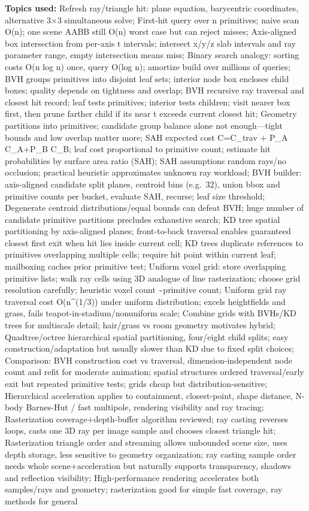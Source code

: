 \textbf{Topics used:} Refresh ray/triangle hit: plane equation, barycentric coordinates, alternative 3×3 simultaneous solve; First-hit query over n primitives; naive scan O(n); one scene AABB still O(n) worst case but can reject misses; Axis-aligned box intersection from per-axis t intervals; intersect x/y/z slab intervals and ray parameter range, empty intersection means miss; Binary search analogy: sorting costs O(n log n) once, query O(log n); amortize build over millions of queries; BVH groups primitives into disjoint leaf sets; interior node box encloses child boxes; quality depends on tightness and overlap; BVH recursive ray traversal and closest hit record; leaf tests primitives; interior tests children; visit nearer box first, then prune farther child if its near t exceeds current closest hit; Geometry partitions into primitives; candidate group balance alone not enough---tight bounds and low overlap matter more; SAH expected cost C=C\_trav + P\_A C\_A+P\_B C\_B; leaf cost proportional to primitive count; estimate hit probabilities by surface area ratio (SAH); SAH assumptions random rays/no occlusion; practical heuristic approximates unknown ray workload; BVH builder: axis-aligned candidate split planes, centroid bins (e.g.~32), union bbox and primitive counts per bucket, evaluate SAH, recurse; leaf size threshold; Degenerate centroid distributions/equal bounds can defeat BVH; huge number of candidate primitive partitions precludes exhaustive search; KD tree spatial partitioning by axis-aligned planes; front-to-back traversal enables guaranteed closest first exit when hit lies inside current cell; KD trees duplicate references to primitives overlapping multiple cells; require hit point within current leaf; mailboxing caches prior primitive test; Uniform voxel grid: store overlapping primitive lists; walk ray cells using 3D analogue of line rasterization; choose grid resolution carefully; heuristic voxel count \textasciitilde primitive count; Uniform grid ray traversal cost O(n\^{}(1/3)) under uniform distribution; excels heightfields and grass, fails teapot-in-stadium/nonuniform scale; Combine grids with BVHs/KD trees for multiscale detail; hair/grass vs room geometry motivates hybrid; Quadtree/octree hierarchical spatial partitioning, four/eight child splits; easy construction/adaptation but usually slower than KD due to fixed split choices; Comparison: BVH construction cost vs traversal, dimension-independent node count and refit for moderate animation; spatial structures ordered traversal/early exit but repeated primitive tests; grids cheap but distribution-sensitive; Hierarchical acceleration applies to containment, closest-point, shape distance, N-body Barnes-Hut / fast multipole, rendering visibility and ray tracing; Rasterization coverage+depth-buffer algorithm reviewed; ray casting reverses loops, casts one 3D ray per image sample and chooses closest triangle hit; Rasterization triangle order and streaming allows unbounded scene size, uses depth storage, less sensitive to geometry organization; ray casting sample order needs whole scene+acceleration but naturally supports transparency, shadows and reflection visibility; High-performance rendering accelerates both samples/rays and geometry; rasterization good for simple fast coverage, ray methods for general 